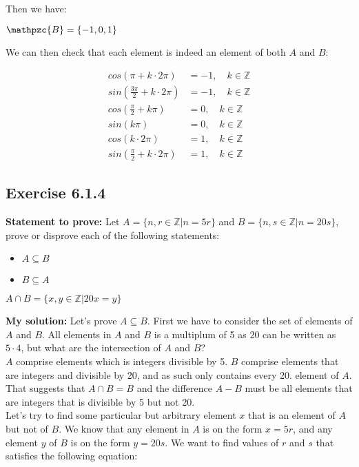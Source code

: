 \documentclass{article}
\newcommand{\cent}[1]{\begin{center}#1\end{center}}
\newcommand{\mAlign}[1]{\begin{align*}#1\end{align*}}
\newcommand{\doubleZ}{\mathbb{Z}}
\newcommand{\In}{\! \in \!}
\newcommand{\script}[1]{\mathpzc{#1}}
\newcommand{\Prove}{\textbf{Statement to prove: }}
\newcommand{\Solution}{\textbf{My solution: }}
\newcommand{\QED}{\boxed{}}
\newcommand{\Exercise}[1]{\subsection*{Exercise #1}}
\begin{document}
\begin{enumerate}[label = \textbf{a.}]
		Then we have:
		
		\cent{$\script{B} = \{-1,0,1\}$}
		
		We can then check that each element is indeed an element of both $A$ and $B$:
		
		\mAlign{cos(\pi + k \cdot 2\pi) &= -1, \quad k \In \doubleZ\\
						sin(\frac{3\pi}{2} + k \cdot 2\pi) &= -1,  \quad k \In \doubleZ\\
						cos(\frac{\pi}{2} + k \pi) &= 0, \quad k \In \doubleZ\\
						sin(k\pi) &= 0, \quad k \In \doubleZ\\
						cos(k \cdot 2 \pi) &= 1,\quad k \In \doubleZ\\
						sin(\frac{\pi}{2} + k \cdot 2 \pi) &= 1,\quad k \In \doubleZ}
					
		\QED
	\end{enumerate}	
	
	\Exercise{6.1.4} 
		
	\Prove
	Let $A = \{n,r \In \doubleZ | n = 5r\}$ and $B = \{n,s \In \doubleZ | n = 20s\}$, prove or disprove each of the following statements:
	\begin{itemize}
		\item $A \subseteq B$
		\item $B \subseteq A$
	\end{itemize}

	\cent{$A \cap B = \{x,y \In \doubleZ | 20x = y\}$}
	
	\Solution
	Let's prove $A \subseteq B$. First we have to consider the set of elements of $A$ and $B$. All elements in $A$ and $B$ is a multiplum of 5 as $20$ can be written as $5 \cdot 4$, but what are the intersection of $A$ and $B$?\\
	
	$A$ comprise elements which is integers divisible by 5. $B$ comprise elements that are integers and  divisible by 20, and as such only contains every 20. element of $A$. That suggests that  $A \cap B = B$ and the difference $A - B$ must be all elements that are integers that is divisible by 5 but not 20.\\
	
	Let's try to find some particular but arbitrary element $x$ that is an element of $A$ but not of $B$. We know that any element in $A$ is on the form $x = 5r$, and any element $y$ of $B$ is on the form $y = 20s $. We want to find values of $r$ and $s$ that satisfies the following equation:
	
\end{document}
